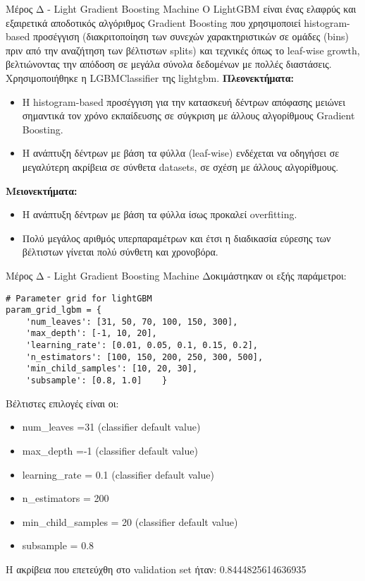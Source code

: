 \documentclass{beamer}
\begin{document}

\begin{frame}[fragile]{Μέρος Δ - Light Gradient Boosting Machine}
\vspace{-0.1cm}
Ο LightGBM είναι ένας ελαφρύς και εξαιρετικά αποδοτικός αλγόριθμος Gradient Boosting που χρησιμοποιεί histogram-based προσέγγιση (διακριτοποίηση των συνεχών χαρακτηριστικών σε ομάδες (bins) πριν από την αναζήτηση των βέλτιστων splits) και τεχνικές όπως το leaf-wise growth, βελτιώνοντας την απόδοση σε μεγάλα σύνολα δεδομένων με πολλές διαστάσεις. Χρησιμοποιήθηκε η LGBMClassifier της lightgbm.
\textbf{Πλεονεκτήματα:}
\begin{itemize}
    \item Η histogram-based προσέγγιση για την κατασκευή δέντρων απόφασης μειώνει σημαντικά τον χρόνο εκπαίδευσης σε σύγκριση με άλλους αλγορίθμους Gradient Boosting.
    \item  Η ανάπτυξη δέντρων με βάση τα φύλλα (leaf-wise) ενδέχεται να οδηγήσει σε μεγαλύτερη ακρίβεια σε σύνθετα datasets, σε σχέση με άλλους αλγορίθμους.
\end{itemize}
\textbf{Μειονεκτήματα:}
\begin{itemize}
    \item Η ανάπτυξη δέντρων με βάση τα φύλλα ίσως προκαλεί overfitting.
    \item Πολύ μεγάλος αριθμός υπερπαραμέτρων και έτσι η διαδικασία εύρεσης των βέλτιστων γίνεται πολύ σύνθετη και χρονοβόρα.
\end{itemize}
\end{frame}
\begin{frame}[fragile]{Μέρος Δ - Light Gradient Boosting Machine}
Δοκιμάστηκαν οι εξής παράμετροι:
\lstset{style=python}
\begin{lstlisting}
# Parameter grid for lightGBM
param_grid_lgbm = {
    'num_leaves': [31, 50, 70, 100, 150, 300],
    'max_depth': [-1, 10, 20],         
    'learning_rate': [0.01, 0.05, 0.1, 0.15, 0.2], 
    'n_estimators': [100, 150, 200, 250, 300, 500],   
    'min_child_samples': [10, 20, 30], 
    'subsample': [0.8, 1.0]    }
\end{lstlisting}

Βέλτιστες επιλογές είναι οι:
\begin{itemize}
    \item num\_leaves =31 (classifier default value)
    \item max\_depth =-1 (classifier default value)
    \item learning\_rate = 0.1 (classifier default value)
    \item n\_estimators = 200
    \item min\_child\_samples = 20 (classifier default value)
    \item subsample = 0.8
\end{itemize}
Η ακρίβεια που επετεύχθη στο validation set ήταν: 0.8444825614636935
\end{frame}
\end{document}
